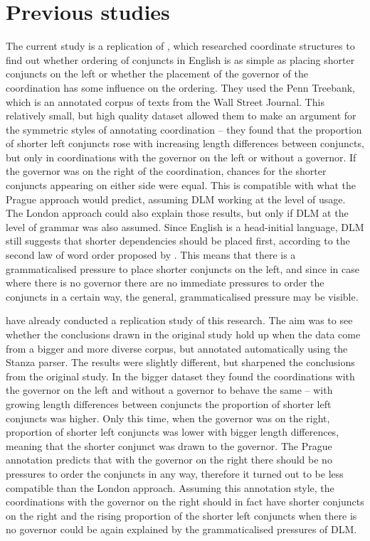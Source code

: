 \section{Previous studies}\label{sec:previous}
The current study is a replication of \cite{prz:woz:23}, which researched coordinate structures to find out whether ordering of conjuncts in English is as simple as placing shorter conjuncts on the left or whether the placement of the governor of the coordination has some influence on the ordering. They used the Penn Treebank, which is an annotated corpus of texts from the Wall Street Journal. This relatively small, but high quality dataset allowed them to make an argument for the symmetric styles of annotating coordination -- they found that the proportion of shorter left conjuncts rose with increasing length differences between conjuncts, but only in coordinations with the governor on the left or without a governor. If the governor was on the right of the coordination, chances for the shorter conjuncts appearing on either side were equal. This is compatible with what the Prague approach would predict, assuming DLM working at the level of usage. The London approach could also explain those results, but only if DLM at the level of grammar was also assumed. Since English is a head-initial language, DLM still suggests that shorter dependencies should be placed first, according to the second law of word order proposed by \cite{behaghel}. This means that there is a grammaticalised pressure to place shorter conjuncts on the left, and since in case where there is no governor there are no immediate pressures to order the conjuncts in a certain way, the general, grammaticalised pressure may be visible. 

\cite{pbg2023} have already conducted a replication study of this research. The aim was to see whether the conclusions drawn in the original study hold up when the data come from a bigger and more diverse corpus, but annotated automatically using the Stanza parser. The results were slightly different, but sharpened the conclusions from the original study. In the bigger dataset they found the coordinations with the governor on the left and without a governor to behave the same -- with growing length differences between conjuncts the proportion of shorter left conjuncts was higher. Only this time, when the governor was on the right, proportion of shorter left conjuncts was lower with bigger length differences, meaning that the shorter conjunct was drawn to the governor. The Prague annotation predicts that with the governor on the right there should be no pressures to order the conjuncts in any way, therefore it turned out to be less compatible than the London approach. Assuming this annotation style, the coordinations with the governor on the right should in fact have shorter conjuncts on the right and the rising proportion of the shorter left conjuncts when there is no governor could be again explained by the grammaticalised pressures of DLM. 

